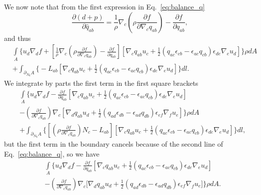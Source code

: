 We now note that from the first expression in Eq.~\eqref{eq:balance_q}
\begin{equation}
	\frac{\partial ( d+ p)}{\partial \widehat{q}_{ab}} =  \frac{1}{\rho}\nabla_c \left(\rho \frac{\partial f}{\partial \nabla_c q_{ab}} \right) - \frac{\partial f}{\partial q_{ab}}, 
\end{equation}
and thus
\begin{equation}
	\label{eq:weak_v_disc_app3}
	\begin{aligned}
		&\underset{ A}{\int} \bigg \{  u_d \nabla_d f + \left[ \frac{1}{\rho}\nabla_c \left(\rho \frac{\partial f}{\partial \nabla_c q_{ab}}\right) - \frac{\partial f}{\partial q_{ab}} \right] \left[\nabla_c q_{ab} u_c +\frac{1}{2}\left(q_{ac} \epsilon_{cb}-\epsilon_{ac}q_{cb}\right) \epsilon_{de}\nabla_e u_d\right] \bigg \} \rho dA \\
		&+  \int_{\partial_{N_{\bm{t}}} A} \bigg\{  -L_{ab} \left[\nabla_c q_{ab} u_c +\frac{1}{2}\left(q_{ac} \epsilon_{cb}-\epsilon_{ac}q_{cb}\right) \epsilon_{de}\nabla_e u_d\right]  \bigg\}dl.
	\end{aligned}
\end{equation}
We integrate by parts the first term in the first square brackets 
\begin{equation}
	\label{eq:weak_v_disc_app4}
	\begin{aligned}
		&\underset{ A}{\int} \bigg \{  u_d \nabla_d f - \frac{\partial f}{\partial q_{ab}} \left[\nabla_c q_{ab} u_c +\frac{1}{2}\left(q_{ac} \epsilon_{cb}-\epsilon_{ac}q_{cb}\right) \epsilon_{de}\nabla_e u_d\right] \\
		&- \left( \frac{\partial f}{\partial \nabla_c q_{ab}}\right) \nabla_c \left[\nabla_d q_{ab} u_d +\frac{1}{2}\left(q_{ad} \epsilon_{db}-\epsilon_{ad}q_{db}\right) \epsilon_{ef}\nabla_f u_e\right] \bigg \} \rho dA \\
		&+  \int_{\partial_{N_{\bm{t}}} A} \bigg\{ \left[\left(\rho \frac{\partial f}{\partial \nabla_c q_{ab}}\right) N_c-L_{ab} \right] \left[\nabla_c q_{ab} u_c +\frac{1}{2}\left(q_{ac} \epsilon_{cb}-\epsilon_{ac}q_{cb}\right) \epsilon_{de}\nabla_e u_d\right]   \bigg\}dl,
	\end{aligned}
\end{equation}
but the first term in the boundary cancels because of the second line of Eq.~\eqref{eq:balance_q}, so we have
\begin{equation}
	\begin{aligned}
		&\underset{ A}{\int} \bigg \{  u_d \nabla_d f - \frac{\partial f}{\partial q_{ab}} \left[\nabla_c q_{ab} u_c +\frac{1}{2}\left(q_{ac} \epsilon_{cb}-\epsilon_{ac}q_{cb}\right) \epsilon_{de}\nabla_e u_d\right] \\
		&- \left( \frac{\partial f}{\partial \nabla_c q_{ab}}\right) \nabla_c \bigg[\nabla_d q_{ab} u_d +\frac{1}{2}\left(q_{ad} \epsilon_{db}-\epsilon_{ad}q_{db}\right) \epsilon_{ef}\nabla_f u_e\bigg] \bigg \} \rho dA.
	\end{aligned}
\end{equation}

